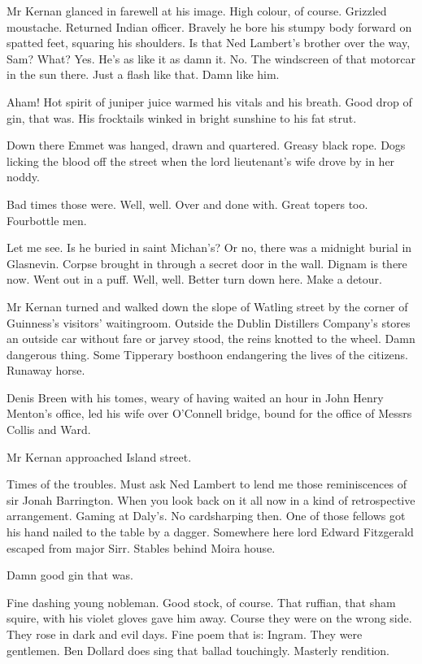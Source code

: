 Mr Kernan glanced in farewell at his image. High colour, of course.
Grizzled moustache. Returned Indian officer. Bravely he bore his stumpy
body forward on spatted feet, squaring his shoulders. Is that Ned
Lambert's brother over the way, Sam? What? Yes. He's as like it as damn
it. No. The windscreen of that motorcar in the sun there. Just a flash
like that. Damn like him.

Aham! Hot spirit of juniper juice warmed his vitals and his breath. Good
drop of gin, that was. His frocktails winked in bright sunshine to his
fat strut.

Down there Emmet was hanged, drawn and quartered. Greasy black rope. Dogs
licking the blood off the street when the lord lieutenant's wife drove by
in her noddy.

Bad times those were. Well, well. Over and done with. Great topers too.
Fourbottle men.

Let me see. Is he buried in saint Michan's? Or no, there was a midnight
burial in Glasnevin. Corpse brought in through a secret door in the wall.
Dignam is there now. Went out in a puff. Well, well. Better turn down
here. Make a detour.

Mr Kernan turned and walked down the slope of Watling street by the
corner of Guinness's visitors' waitingroom. Outside the Dublin Distillers
Company's stores an outside car without fare or jarvey stood, the reins
knotted to the wheel. Damn dangerous thing. Some Tipperary bosthoon
endangering the lives of the citizens. Runaway horse.

Denis Breen with his tomes, weary of having waited an hour in John Henry
Menton's office, led his wife over O'Connell bridge, bound for the office
of Messrs Collis and Ward.

Mr Kernan approached Island street.

Times of the troubles. Must ask Ned Lambert to lend me those
reminiscences of sir Jonah Barrington. When you look back on it all now
in a kind of retrospective arrangement. Gaming at Daly's. No cardsharping
then. One of those fellows got his hand nailed to the table by a dagger.
Somewhere here lord Edward Fitzgerald escaped from major Sirr. Stables
behind Moira house.

Damn good gin that was.

Fine dashing young nobleman. Good stock, of course. That ruffian, that
sham squire, with his violet gloves gave him away. Course they were on
the wrong side. They rose in dark and evil days. Fine poem that is:
Ingram. They were gentlemen. Ben Dollard does sing that ballad
touchingly. Masterly rendition.


